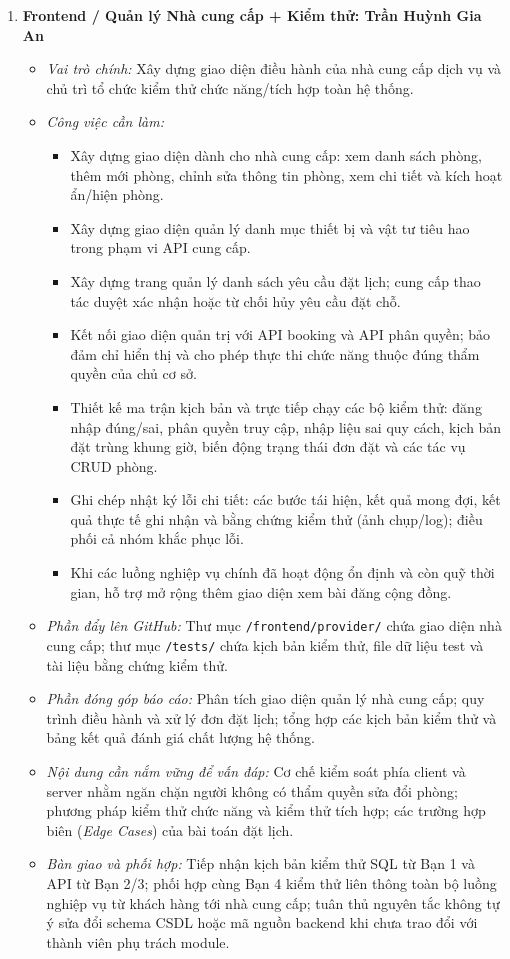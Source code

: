 \begin{enumerate}[leftmargin=1.5em]
    \item \textbf{Frontend / Quản lý Nhà cung cấp + Kiểm thử: Trần Huỳnh Gia An}
    \begin{itemize}[leftmargin=1.2em]
        \item \textit{Vai trò chính:} Xây dựng giao diện điều hành của nhà cung cấp dịch vụ và chủ trì tổ chức kiểm thử chức năng/tích hợp toàn hệ thống.
        \item \textit{Công việc cần làm:}
        \begin{itemize}[label={--}]
            \item Xây dựng giao diện dành cho nhà cung cấp: xem danh sách phòng, thêm mới phòng, chỉnh sửa thông tin phòng, xem chi tiết và kích hoạt ẩn/hiện phòng.
            \item Xây dựng giao diện quản lý danh mục thiết bị và vật tư tiêu hao trong phạm vi API cung cấp.
            \item Xây dựng trang quản lý danh sách yêu cầu đặt lịch; cung cấp thao tác duyệt xác nhận hoặc từ chối hủy yêu cầu đặt chỗ.
            \item Kết nối giao diện quản trị với API booking và API phân quyền; bảo đảm chỉ hiển thị và cho phép thực thi chức năng thuộc đúng thẩm quyền của chủ cơ sở.
            \item Thiết kế ma trận kịch bản và trực tiếp chạy các bộ kiểm thử: đăng nhập đúng/sai, phân quyền truy cập, nhập liệu sai quy cách, kịch bản đặt trùng khung giờ, biến động trạng thái đơn đặt và các tác vụ CRUD phòng.
            \item Ghi chép nhật ký lỗi chi tiết: các bước tái hiện, kết quả mong đợi, kết quả thực tế ghi nhận và bằng chứng kiểm thử (ảnh chụp/log); điều phối cả nhóm khắc phục lỗi.
            \item Khi các luồng nghiệp vụ chính đã hoạt động ổn định và còn quỹ thời gian, hỗ trợ mở rộng thêm giao diện xem bài đăng cộng đồng.
        \end{itemize}
        \item \textit{Phần đẩy lên GitHub:} Thư mục \texttt{/frontend/provider/} chứa giao diện nhà cung cấp; thư mục \texttt{/tests/} chứa kịch bản kiểm thử, file dữ liệu test và tài liệu bằng chứng kiểm thử.
        \item \textit{Phần đóng góp báo cáo:} Phân tích giao diện quản lý nhà cung cấp; quy trình điều hành và xử lý đơn đặt lịch; tổng hợp các kịch bản kiểm thử và bảng kết quả đánh giá chất lượng hệ thống.
        \item \textit{Nội dung cần nắm vững để vấn đáp:} Cơ chế kiểm soát phía client và server nhằm ngăn chặn người không có thẩm quyền sửa đổi phòng; phương pháp kiểm thử chức năng và kiểm thử tích hợp; các trường hợp biên (\textit{Edge Cases}) của bài toán đặt lịch.
        \item \textit{Bàn giao và phối hợp:} Tiếp nhận kịch bản kiểm thử SQL từ Bạn 1 và API từ Bạn 2/3; phối hợp cùng Bạn 4 kiểm thử liên thông toàn bộ luồng nghiệp vụ từ khách hàng tới nhà cung cấp; tuân thủ nguyên tắc không tự ý sửa đổi schema CSDL hoặc mã nguồn backend khi chưa trao đổi với thành viên phụ trách module.
    \end{itemize}
\end{enumerate}
